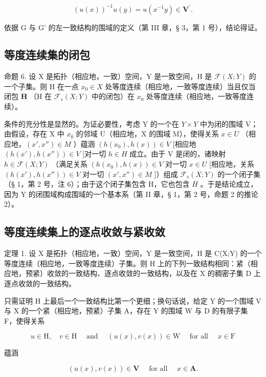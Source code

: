 \[
(u (x)) ^ {- 1} u (y) = u (x ^ {- 1} y) \in \mathbf {V} ^ {\prime}.
\]

依据 G 与 G' 的左一致结构的围域的定义（第 III 章，§ 3，第 1 号），结论得证。

\subsection{等度连续集的闭包}

命题 6. 设 X 是拓扑（相应地，一致）空间，Y 是一致空间，H 是 \(\mathcal{F}(X;Y)\) 的一个子集。则 H 在一点 \(x_0 \in X\) 处等度连续（相应地，一致等度连续）当且仅当闭包 \(\overline{\mathbf{H}}\) （H 在 \(\mathcal{F}_s(X;Y)\) 中的闭包）在 \(x_0\) 处等度连续（相应地，一致等度连续）。

条件的充分性是显然的。为证必要性，考虑 Y 的一个在 \(Y \times Y\) 中为闭的围域 V；由假设，存在 X 中 \(x_{0}\) 的邻域 U（相应地，X 的围域 M），使得关系 \(x \in U\) （相应地，\((x', x'') \in M\) ）蕴涵 \((h(x_{0}), h(x)) \in V\) {[}相应地 \((h(x'), h(x'')) \in V\) {]}对一切 \(h \in H\) 成立。由于 V 是闭的，诸映射 \(h \in \mathcal{F}(X; Y)\) （满足关系 \((h(x_{0}), h(x)) \in V\) 对一切 \(x \in U\) {[}相应地，关系 \((h(x'), h(x'')) \in V\) 对一切 \((x', x'') \in M\) {]}）组成 \(\mathcal{F}_{s}(X; Y)\) 的一个闭子集（§ 1，第 2 号，注 6）；由于这个闭子集包含 H，它也包含 \(\overline{H}\) 。于是结论成立，因为 Y 的闭围域构成围域的一个基本系（第 II 章，§ 1，第 2 号，命题 2 的推论 2）。

\subsection{等度连续集上的逐点收敛与紧收敛}

定理 1. 设 X 是拓扑（相应地，一致）空间，Y 是一致空间，H 是 C(X;Y) 的一个等度连续（相应地，一致等度连续）子集。则 H 上的下列一致结构相同：紧（相应地，预紧）收敛的一致结构、逐点收敛的一致结构，以及在 X 的稠密子集 D 上逐点收敛的一致结构。

只需证明 H 上最后一个一致结构比第一个更细；换句话说，给定 Y 的一个围域 V 与 X 的一个紧（相应地，预紧）子集 A，存在 Y 的围域 W 与 D 的有限子集 F，使得关系

\[
u \in \mathrm{H}, \quad v \in \mathrm{H} \quad \text { and } \quad (u (x), v (x)) \in \mathrm{W} \quad \text { for   all } \quad x \in \mathrm{F}\tag{2}
\]

蕴涵

\[
(u (x), v (x)) \in \mathbf {V} \quad \text { for   all } \quad x \in \mathbf {A}.\tag{3}
\]

